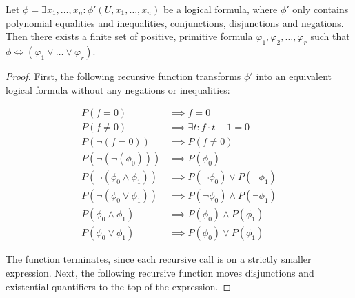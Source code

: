 \begin{lemma}\label{lem:logical_positive}
Let $\phi = \exists x_{1}, \dots, x_{n} : \phi'(U, x_{1}, \dots, x_{n})$ be a logical formula, where $\phi'$ only contains polynomial equalities and inequalities, conjunctions, disjunctions and negations. Then there exists a finite set of positive, primitive formula $\varphi_{1}, \varphi_{2}, \dots, \varphi_{r}$ such that $\phi \iff (\varphi_{1} \lor \dots \lor \varphi_{r})$.
\end{lemma}
\begin{proof}
  First, the following recursive function transforms $\phi'$ into an equivalent logical formula without any negations or inequalities:

  \begin{align*}
    P(f = 0) &\implies f = 0 \\
    P(f \neq 0) &\implies \exists t : f \cdot t - 1 = 0 \\
    P(\neg(f = 0)) &\implies P(f \neq 0) \\
    P(\neg(\neg(\phi_{0}))) &\implies P(\phi_{0}) \\
    P(\neg(\phi_{0} \land \phi_{1})) &\implies P(\neg \phi_{0}) \lor P(\neg \phi_{1}) \\
    P(\neg(\phi_{0} \lor \phi_{1})) &\implies P(\neg \phi_{0}) \land P(\neg \phi_{1}) \\
    P(\phi_{0} \land \phi_{1}) &\implies P(\phi_{0}) \land P(\phi_{1}) \\
    P(\phi_{0} \lor \phi_{1}) &\implies P(\phi_{0}) \lor P(\phi_{1})
  \end{align*}

  The function terminates, since each recursive call is on a strictly smaller expression. Next, the following recursive function moves disjunctions and existential quantifiers to the top of the expression.


\end{proof}
